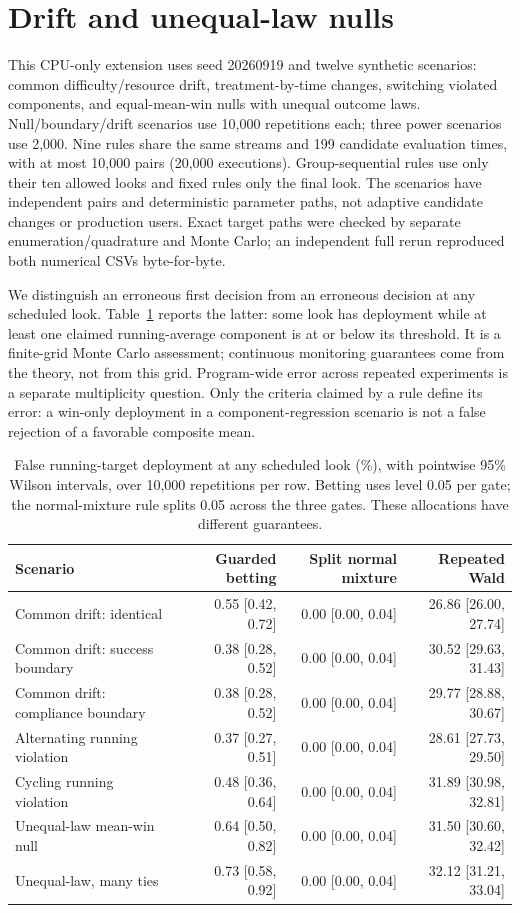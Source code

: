 \section{Drift and unequal-law nulls}
\label{app:drift_extension}
This CPU-only extension uses seed 20260919 and twelve synthetic scenarios:
common difficulty/resource drift, treatment-by-time changes, switching
violated components, and equal-mean-win nulls with unequal outcome laws.
Null/boundary/drift scenarios use 10,000 repetitions each; three power
scenarios use 2,000. Nine rules share the same streams and 199 candidate
evaluation times, with at most 10,000 pairs (20,000 executions).
Group-sequential rules use only their ten allowed looks and fixed rules
only the final look. The scenarios have
independent pairs and deterministic parameter paths, not adaptive
candidate changes or production users. Exact target paths were checked
by separate enumeration/quadrature and Monte Carlo; an independent full
rerun reproduced both numerical CSVs byte-for-byte.

We distinguish an erroneous first decision from an erroneous decision
at any scheduled look. Table~\ref{tab:drift_extension} reports the latter:
some look has deployment while at least one claimed running-average
component is at or below its threshold. It is a finite-grid Monte Carlo
assessment; continuous monitoring guarantees come from the theory, not
from this grid. Program-wide error across repeated experiments is a
separate multiplicity question. Only the criteria claimed by a rule
define its error: a win-only deployment in a component-regression scenario
is not a false rejection of a favorable composite mean.

\begin{table}[h]\centering\scriptsize
\caption{False running-target deployment at any scheduled look (\%),
with pointwise 95\% Wilson intervals, over 10,000 repetitions per row.
Betting uses level 0.05 per gate; the normal-mixture rule splits 0.05
across the three gates. These allocations have different guarantees.}
\label{tab:drift_extension}
\begin{tabular}{lrrr}\toprule
Scenario & Guarded betting & Split normal mixture & Repeated Wald\\\midrule
Common drift: identical & 0.55 [0.42, 0.72] & 0.00 [0.00, 0.04] & 26.86 [26.00, 27.74] \\
Common drift: success boundary & 0.38 [0.28, 0.52] & 0.00 [0.00, 0.04] & 30.52 [29.63, 31.43] \\
Common drift: compliance boundary & 0.38 [0.28, 0.52] & 0.00 [0.00, 0.04] & 29.77 [28.88, 30.67] \\
Alternating running violation & 0.37 [0.27, 0.51] & 0.00 [0.00, 0.04] & 28.61 [27.73, 29.50] \\
Cycling running violation & 0.48 [0.36, 0.64] & 0.00 [0.00, 0.04] & 31.89 [30.98, 32.81] \\
Unequal-law mean-win null & 0.64 [0.50, 0.82] & 0.00 [0.00, 0.04] & 31.50 [30.60, 32.42] \\
Unequal-law, many ties & 0.73 [0.58, 0.92] & 0.00 [0.00, 0.04] & 32.12 [31.21, 33.04] \\
\bottomrule\end{tabular}\end{table}

